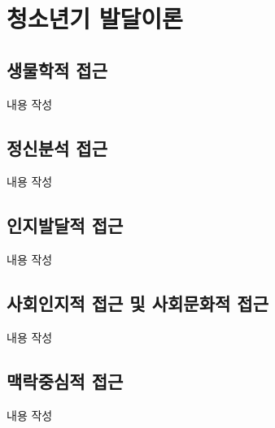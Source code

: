 \section{청소년기 발달이론}

\subsection{생물학적 접근}
내용 작성

\subsection{정신분석 접근}
내용 작성

\subsection{인지발달적 접근}
내용 작성

\subsection{사회인지적 접근 및 사회문화적 접근}
내용 작성

\subsection{맥락중심적 접근}
내용 작성
